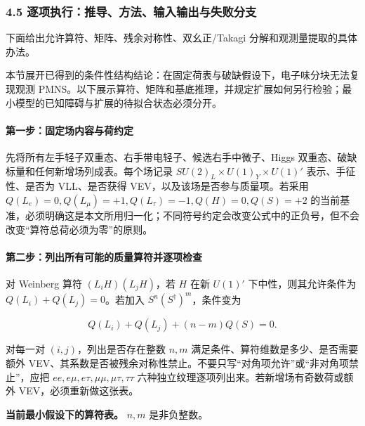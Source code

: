 \documentclass[
]{article}
\begin{document}
\subsubsection{4.5
逐项执行：推导、方法、输入输出与失败分支}\label{ux9010ux9879ux6267ux884cux63a8ux5bfcux65b9ux6cd5ux8f93ux5165ux8f93ux51faux4e0eux5931ux8d25ux5206ux652f-2}

下面给出允许算符、矩阵、残余对称性、双幺正/Takagi
分解和观测量提取的具体办法。

本节展开已得到的条件性结构结论：在固定荷表与破缺假设下，电子味分块无法复现观测
PMNS。以下展示算符、矩阵和基底推理，并规定扩展如何另行检验；最小模型的已知障碍与扩展的待拟合状态必须分开。

\paragraph{第一步：固定场内容与荷约定}\label{ux7b2cux4e00ux6b65ux56faux5b9aux573aux5185ux5bb9ux4e0eux8377ux7ea6ux5b9a}

先将所有左手轻子双重态、右手带电轻子、候选右手中微子、Higgs
双重态、破缺标量和任何新增场列成表。每个场记录
\(SU(2)_L\times U(1)_Y\times U(1)'\) 表示、手征性、是否为 VLL、是否获得
VEV，以及该场是否参与质量项。若采用
\(Q(L_e)=0,Q(L_\mu)=+1,Q(L_\tau)=-1,Q(H)=0,Q(S)=+2\)
的当前基准，必须明确这是本文所用归一化；不同符号约定会改变公式中的正负号，但不会改变``算符总荷必须为零''的原则。

\paragraph{第二步：列出所有可能的质量算符并逐项检查}\label{ux7b2cux4e8cux6b65ux5217ux51faux6240ux6709ux53efux80fdux7684ux8d28ux91cfux7b97ux7b26ux5e76ux9010ux9879ux68c0ux67e5}

对 Weinberg 算符 \((L_iH)(L_jH)\)，若 \(H\) 在新 \(U(1)'\)
下中性，则其允许条件为 \(Q(L_i)+Q(L_j)=0\)。若加入
\(S^n(S^\dagger)^m\)，条件变为

\[Q(L_i)+Q(L_j)+(n-m)Q(S)=0.\]

对每一对 \((i,j)\)，列出是否存在整数 \(n,m\)
满足条件、算符维数是多少、是否需要额外
VEV、其系数是否被残余对称性禁止。不要只写``对角项允许''或``非对角项禁止''，应把
\(ee,e\mu,e\tau,\mu\mu,\mu\tau,\tau\tau\)
六种独立纹理逐项列出来。若新增场有奇数荷或额外 VEV，必须重新做这张表。

\textbf{当前最小假设下的算符表。} \(n,m\) 是非负整数。
\end{document}
